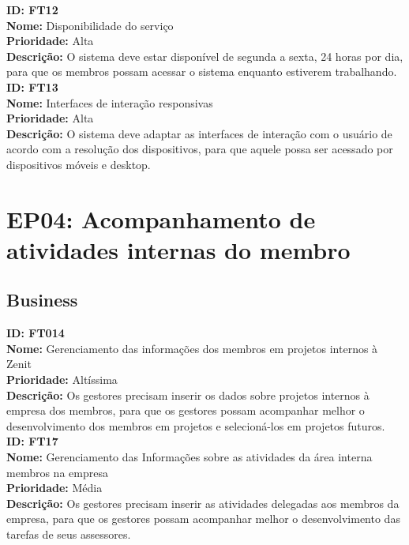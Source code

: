 \begin{anexosenv}
\textbf{ID: FT12}\\
\textbf{Nome:} Disponibilidade do serviço\\
\textbf{Prioridade:} Alta\\
\textbf{Descrição:} O sistema deve estar disponível de segunda a sexta, 24 horas por dia, para que os membros possam acessar o sistema enquanto estiverem trabalhando.\\


\textbf{ID: FT13}\\
\textbf{Nome:} Interfaces de interação responsivas\\
\textbf{Prioridade:} Alta\\
\textbf{Descrição:} O sistema deve adaptar as interfaces de interação com o usuário de acordo com a resolução dos dispositivos, para que aquele possa ser acessado por dispositivos móveis e desktop.\\

\section[EP04: Acompanhamento de atividades internas do membro]{EP04: Acompanhamento de atividades internas do membro}

\subsection[Business]{Business}

\textbf{ID: FT014}\\
\textbf{Nome: }Gerenciamento das informações dos membros em projetos internos à Zenit\\
\textbf{Prioridade:} Altíssima\\
\textbf{Descrição:} Os gestores precisam inserir os dados sobre projetos internos à empresa dos membros, para que os gestores possam acompanhar melhor o desenvolvimento dos membros em projetos e selecioná-los em projetos futuros.\\

\textbf{ID: FT17}\\
\textbf{Nome: }Gerenciamento das Informações sobre as atividades da área interna membros na empresa\\
\textbf{Prioridade:} Média\\
\textbf{Descrição:} Os gestores precisam inserir as atividades delegadas aos membros da empresa, para que os gestores possam acompanhar melhor o desenvolvimento das tarefas de seus assessores.\\


\end{anexosenv}
